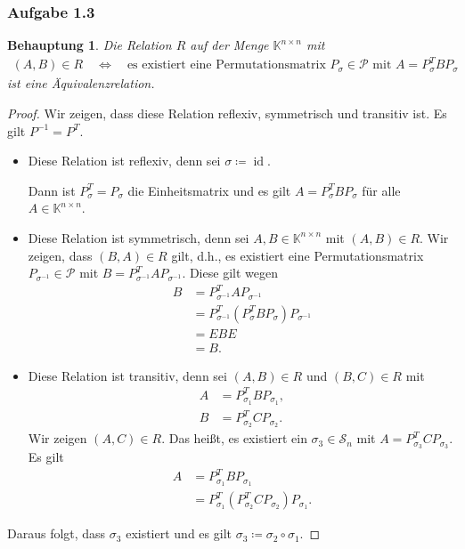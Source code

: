 \documentclass[draft,a5paper]{article}
\newtheorem*{beh}{Behauptung}
\DeclareMathOperator{\id}{id}
\begin{document}
\subsubsection*{Aufgabe 1.3}

\begin{beh}
  Die Relation \(R\) auf der Menge \(\mathbb{K}^{n \times n}\) mit
  \begin{align*}
    (A, B) \in R \quad \iff  \quad \text{es existiert eine Permutationsmatrix }
    P_{\sigma} \in \mathcal{P} \text{ mit } A = P_{\sigma}^{T}BP_{\sigma}
  \end{align*}
  ist eine Äquivalenzrelation.
\end{beh}

\begin{proof}
  Wir zeigen, dass diese Relation reflexiv, symmetrisch und transitiv
  ist.  Es gilt \(P^{-1} = P^{T}\).
  \begin{itemize}
  \item   Diese Relation ist reflexiv, denn sei \(\sigma \coloneq \id\).

    Dann ist \(P_{\sigma}^{T} = P_{\sigma} \) die Einheitsmatrix und es gilt
    \(A = P_{\sigma}^{T}BP_{\sigma}\) für alle \(A \in \mathbb{K}^{n \times n}\).

  \item   Diese Relation ist symmetrisch, denn sei \(A, B \in
    \mathbb{K}^{n \times n}\) mit \((A, B) \in R\).  Wir zeigen, dass \((B,
    A) \in R\) gilt, d.h., es existiert eine Permutationsmatrix \(P_{\sigma^{-1}}
    \in \mathcal{P} \) mit \(B = P_{\sigma^{-1}}^{T}AP_{\sigma^{-1}}\).  Diese gilt wegen
    \begin{align*}
      B &= P_{\sigma^{-1}}^{T}AP_{\sigma^{-1}} \\
        &= P_{\sigma^{-1}}^{T}(P_{\sigma}^{T}BP_{\sigma})P_{\sigma^{-1}} \\
        &= EBE \\
        &= B.
    \end{align*}
  \item Diese Relation ist transitiv, denn sei \((A, B) \in R\) und
    \((B, C) \in R\) mit
    \begin{align*}
      A &= P_{\sigma_{1}}^{T} B P_{\sigma_{1}}, \\
      B &= P_{\sigma_{2}}^{T} C P_{\sigma_{2}}.
    \end{align*}
    Wir zeigen \((A, C) \in R\).  Das heißt, es existiert ein \(\sigma_{3} \in
    \mathcal{S}_{n}\) mit \(A = P_{\sigma_{3}}^{T} C P_{\sigma_{3}}\).  Es gilt
    \begin{align*}
      A &= P_{\sigma_{1}}^{T} B P_{\sigma_{1}} \\
        &= P_{\sigma_{1}}^{T} \left(P_{\sigma_{2}}^{T} C P_{\sigma_{2}}\right) P_{\sigma_{1}}.
    \end{align*}
  \end{itemize}
  Daraus folgt, dass \(\sigma_{3}\) existiert und es gilt \(\sigma_{3} \coloneq \sigma_{2} \circ \sigma_{1}\).
\end{proof}
\end{document}

